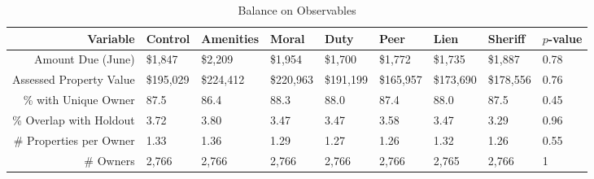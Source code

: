 \documentclass[12pt,titlepage]{article}
\begin{document}
\begin{sidewaystable}[ht]
\centering
\begin{tabular}{|r|lllllll|l|}
  \hline
Variable & Control & Amenities & Moral & Duty & Peer & Lien & Sheriff & $p$-value \\ 
   \hline
Amount Due (June) & \$1,847 & \$2,209 & \$1,954 & \$1,700 & \$1,772 & \$1,735 & \$1,887 & 0.78 \\ 
  Assessed Property Value & \$195,029 & \$224,412 & \$220,963 & \$191,199 & \$165,957 & \$173,690 & \$178,556 & 0.76 \\ 
  \% with Unique Owner & 87.5 & 86.4 & 88.3 & 88.0 & 87.4 & 88.0 & 87.5 & 0.45 \\ 
  \% Overlap with Holdout & 3.72 & 3.80 & 3.47 & 3.47 & 3.58 & 3.47 & 3.29 & 0.96 \\ 
  \# Properties per Owner & 1.33 & 1.36 & 1.29 & 1.27 & 1.26 & 1.32 & 1.26 & 0.55 \\ 
  \# Owners & 2,766 & 2,766 & 2,766 & 2,766 & 2,766 & 2,765 & 2,766 & 1 \\ 
   \hline
\end{tabular}
\caption{Balance on Observables} 
\label{tbl:balance}
\end{sidewaystable}
\end{document}
